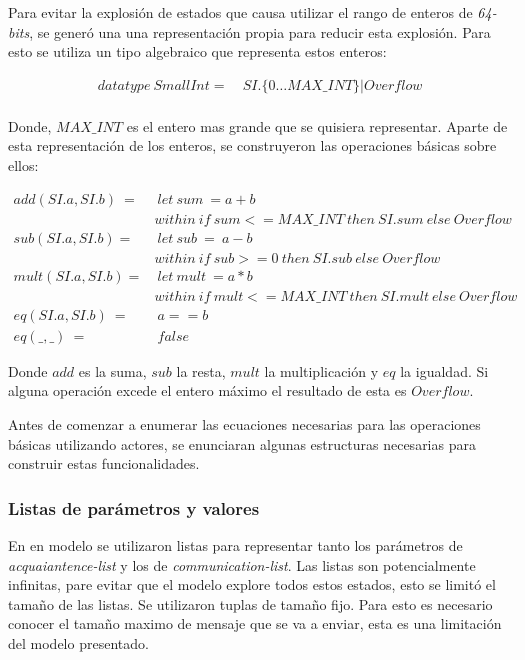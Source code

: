 Para evitar la explosión de estados que causa utilizar el rango de enteros de \textit{64-bits}, se generó una una representación propia para reducir esta explosión. Para esto se utiliza un tipo algebraico que representa estos enteros:

\begin{align*}
datatype\ SmallInt =&\ SI.\{0 \ldots MAX\_INT\} | Overflow \\
\end{align*}

Donde, $MAX\_INT$ es el entero mas grande que se quisiera representar. Aparte de esta representación de los enteros, se construyeron las operaciones básicas sobre ellos:

\begin{align*}
add(SI.a, SI.b)\ =&\ let\ sum\ = a + b \\
&within\ if\ sum <= MAX\_INT\ then\ SI.sum\ else\ Overflow  \\
%
sub(SI.a, SI.b) =&\ let\ sub\ =\ a - b \\
& within\ if\ sub >= 0\ then\ SI.sub\ else\ Overflow \\
%
mult(SI.a, SI.b) =&\ let\ mult\ = a * b \\
& within\ if\ mult <= MAX\_INT\ then\ SI.mult\ else\ Overflow \\
eq(SI.a, SI.b)\ =&\ a == b \\
eq(\_, \_)\ =&\ false
\end{align*}

Donde $add$ es la suma, $sub$ la resta, $mult$ la multiplicación y $eq$ la igualdad. Si alguna operación excede el entero máximo el resultado de esta es $Overflow$.

Antes de comenzar a enumerar las ecuaciones necesarias para las operaciones básicas utilizando actores, se enunciaran algunas estructuras necesarias para construir estas funcionalidades.


\subsubsection*{Listas de parámetros y valores}

En en modelo se utilizaron listas para representar tanto los parámetros de \textit{acquaiantence-list} y los de \textit{communication-list}. Las listas son potencialmente infinitas, pare evitar que el modelo explore todos estos estados, esto se limitó el tamaño de las listas. Se utilizaron tuplas de tamaño fijo. Para esto es necesario conocer el tamaño maximo de mensaje que se va a enviar, esta es una limitación del modelo presentado.

